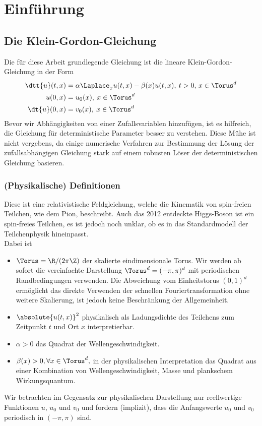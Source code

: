 
\chapter{Einführung} %

\label{Chapter1} %

\section{Die Klein-Gordon-Gleichung}
Die für diese Arbeit grundlegende Gleichung ist die lineare Klein-Gordon-Gleichung in der Form
\begin{align}
\label{kgg}
\dtt{u}(t,x)&=\alpha \Laplace_x u(t,x) - \beta(x)u(t,x), \: t>0, \, x\in \Torus^d\\
u(0,x)&=u_0(x), \: x\in \Torus^d\\
\dt{u}(0,x)&=v_0(x), \: x\in \Torus^d
\end{align}
Bevor wir Abhängigkeiten von einer Zufallsvariablen hinzufügen, ist es hilfreich, die Gleichung für deterministische Parameter besser zu verstehen. Diese Mühe ist nicht vergebens, da einige numerische Verfahren zur Bestimmung der Lösung der zufallsabhängigen Gleichung stark auf einem robusten Löser der deterministischen Gleichung basieren.
\subsection{(Physikalische) Definitionen}
Diese ist eine relativistische Feldgleichung, welche die Kinematik von spin-freien Teilchen, wie dem Pion, beschreibt. Auch das 2012 entdeckte Higgs-Boson ist ein spin-freies Teilchen, es ist jedoch noch unklar, ob es in das Standardmodell der Teilchenphysik hineinpasst.\autocite{kleingordon2016}\\
Dabei ist
\begin{itemize}
\item $\Torus=\R/(2\pi\Z)$ der skalierte eindimensionale Torus. Wir werden ab sofort die vereinfachte Darstellung $\Torus^d=(-\pi,\pi)^d$ mit periodischen Randbedingungen verwenden. Die Abweichung vom Einheitstorus $(0,1)^d$ ermöglicht das direkte Verwenden der schnellen Fouriertransformation ohne weitere Skalierung, ist jedoch keine Beschränkung der Allgemeinheit. 
\item $\absolute{u(t,x)}^2$ physikalisch als Ladungsdichte des Teilchens zum Zeitpunkt $t$ und Ort $x$ interpretierbar. 
\item $\alpha>0$ das Quadrat der Wellengeschwindigkeit.
\item $\beta(x)>0, \forall x\in \Torus^d,$ in der physikalischen Interpretation das Quadrat aus einer Kombination von Wellengeschwindigkeit, Masse und plankschem Wirkungsquantum.
\end{itemize}
Wir betrachten im Gegensatz zur physikalischen Darstellung nur reellwertige Funktionen $u$, $u_0$ und $v_0$ und fordern (implizit), dass die Anfangswerte $u_0$ und $v_0$ periodisch in $(-\pi,\pi)$ sind. 


